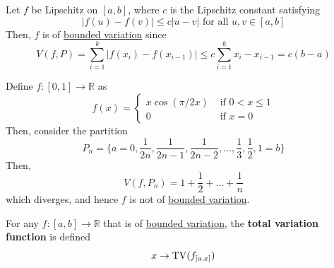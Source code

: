   \begin{example}
    \label{ex:lipschitz-functions-are-of-bounded-variation}
    Let $f$ be Lipschitz on $[a, b]$, where $c$ is the Lipschitz constant satisfying 
    \begin{equation}
      |f(u) - f(v)| \leq c |u - v| \text{ for all } u, v \in [a, b] 
    \end{equation}
    Then, $f$ is of \hyperref[def:bounded-variation]{bounded variation} since 
    \begin{equation}
      V(f, P) = \sum_{i=1}^k |f(x_i) - f(x_{i-1})| \leq c \sum_{i=1}^k x_i - x_{i-1} = c(b - a)
    \end{equation}
  \end{example}
  
  \begin{example}
    \label{ex:not-bounded-variation}
    Define $f: [0, 1] \to \mathbb{R}$ as 
    \begin{equation}
      f(x) = \begin{cases} 
        x \cos (\pi/2x) & \text{ if } 0 < x \leq 1 \\ 
        0 & \text{ if } x = 0
      \end{cases}
    \end{equation}
    Then, consider the partition 
    \begin{equation}
      P_n = \{ a = 0, \frac{1}{2n}, \frac{1}{2n-1} , \frac{1}{2n-2}, \ldots, \frac{1}{3}, \frac{1}{2}, 1 = b\}
    \end{equation}
    Then, 
    \begin{equation}
      V(f, P_n) = 1 + \frac{1}{2} + \ldots + \frac{1}{n}
    \end{equation}
    which diverges, and hence $f$ is not of \hyperref[def:bounded-variation]{bounded variation}. 
  \end{example} 

  \begin{definition}
    \label{def:total-variation-function}
    For any $f: [a, b] \to \mathbb{R}$ that is of \hyperref[def:bounded-variation]{bounded variation}, the \textbf{total variation function} is defined 
    \begin{equation}
      x \to \operatorname{TV} (f_{[a, x]})
    \end{equation}
  \end{definition}

